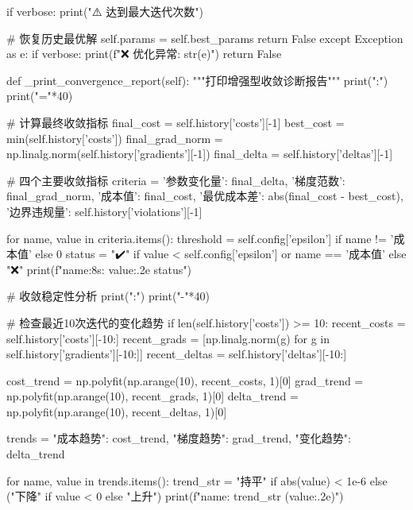 \documentclass[a4paper,12pt]{article}
\begin{document}
\begin{python}
            if verbose:
                print("\n⚠️ 达到最大迭代次数")
            
            # 恢复历史最优解
            self.params = self.best_params
            return False
        except Exception as e:
            if verbose:
                print(f"\n❌ 优化异常: {str(e)}")
            return False

    def _print_convergence_report(self):
        """打印增强型收敛诊断报告"""
        print(":")
        print("="*40)
        
        # 计算最终收敛指标
        final_cost = self.history['costs'][-1]
        best_cost = min(self.history['costs'])
        final_grad_norm = np.linalg.norm(self.history['gradients'][-1])
        final_delta = self.history['deltas'][-1]
        
        # 四个主要收敛指标
        criteria = {
            '参数变化量': final_delta,
            '梯度范数': final_grad_norm,
            '成本值': final_cost,
            '最优成本差': abs(final_cost - best_cost),
            '边界违规量': self.history['violations'][-1]
        }
        
        for name, value in criteria.items():
            threshold = self.config['epsilon'] if name != '成本值' else 0
            status = "✔️" if value < self.config['epsilon'] or name == '成本值' else "❌"
            print(f"{name:8s}: {value:.2e} {status}")
            
        # 收敛稳定性分析
        print(":")
        print("-"*40)
        
        # 检查最近10次迭代的变化趋势
        if len(self.history['costs']) >= 10:
            recent_costs = self.history['costs'][-10:]
            recent_grads = [np.linalg.norm(g) for g in self.history['gradients'][-10:]]
            recent_deltas = self.history['deltas'][-10:]
            
            cost_trend = np.polyfit(np.arange(10), recent_costs, 1)[0]
            grad_trend = np.polyfit(np.arange(10), recent_grads, 1)[0]
            delta_trend = np.polyfit(np.arange(10), recent_deltas, 1)[0]
            
            trends = {
                "成本趋势": cost_trend,
                "梯度趋势": grad_trend,
                "变化趋势": delta_trend
            }
            
            for name, value in trends.items():
                trend_str = "持平" if abs(value) < 1e-6 else ("下降" if value < 0 else "上升")
                print(f"{name}: {trend_str} ({value:.2e})")


\end{python}
\end{document}
